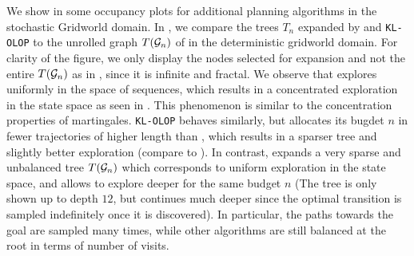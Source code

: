 \documentclass[runningheads]{llncs}
\begin{document}
We show in  some  occupancy plots for additional planning algorithms in the stochastic Gridworld domain.
In , we compare the trees $T_n$ expanded by \OPD and \texttt{KL-OLOP} to the unrolled graph $T(\mathcal{G}_n)$ of \GBOPD in the deterministic gridworld domain. For clarity of the figure, we only display the nodes selected for expansion and not the entire $T(\mathcal{G}_n)$ as in , since it is infinite and fractal. We observe that \OPD explores uniformly in the space of sequences, which results in a concentrated exploration in the state space as seen in . This phenomenon is similar to the concentration properties of martingales. \texttt{KL-OLOP} behaves similarly, but allocates its bugdet $n$ in fewer trajectories of higher length than \OPD, which results in a sparser tree and slightly better exploration (compare  to ). In contrast, \GBOPD expands a very sparse and unbalanced tree $T(\mathcal{G}_n)$ which corresponds to uniform exploration in the state space, and allows to explore deeper for the same budget $n$ (The tree is only shown up to depth $12$, but continues much deeper since the optimal transition is sampled indefinitely once it is discovered). In particular, the paths towards the goal are sampled many times, while other algorithms are still balanced at the root in terms of number of visits.
\end{document}
